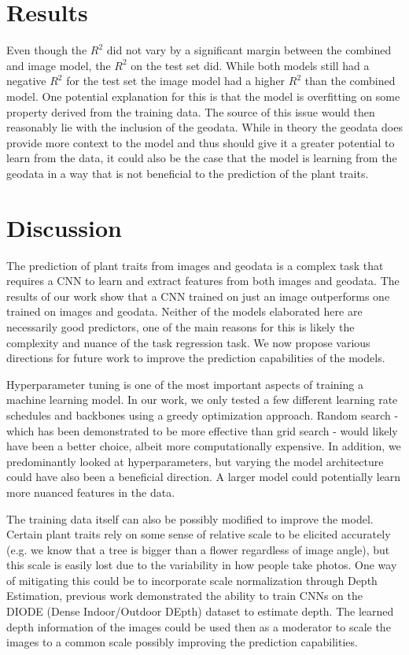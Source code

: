 \documentclass[12pt,a4paper,oneside]{article}
\begin{document}
\section{Results}

Even though the $R^2$ did not vary by a significant margin between the combined and image model, the $R^2$ on the test set did. While both models still had a negative $R^2$ for the test set the image model had a higher $R^2$ than the combined model. One potential explanation for this is that the model is overfitting on some property derived from the training data. The source of this issue would then reasonably lie with the inclusion of the geodata. While in theory the geodata does provide more context to the model and thus should give it a greater potential to learn from the data, it could also be the case that the model is learning from the geodata in a way that is not beneficial to the prediction of the plant traits.   


\section{Discussion}

The prediction of plant traits from images and geodata is a complex task that requires a CNN to learn and extract features from both images and geodata. The results of our work show that a CNN trained on just an image outperforms one trained on images and geodata. Neither of the models elaborated here are necessarily good predictors, one of the main reasons for this is likely the complexity and nuance of the task regression task. We now propose various directions for future work to improve the prediction capabilities of the models.

Hyperparameter tuning is one of the most important aspects of training a machine learning model. In our work, we only tested a few different learning rate schedules and backbones using a greedy optimization approach. Random search - which has been demonstrated to be more effective than grid search \cite{JMLR:v13:bergstra12a} - would likely have been a better choice, albeit more computationally expensive. In addition, we predominantly looked at hyperparameters, but varying the model architecture could have also been a beneficial direction. A larger model could potentially learn more nuanced features in the data. 

The training data itself can also be possibly modified to improve the model. Certain plant traits rely on some sense of relative scale to be elicited accurately (e.g. we know that a tree is bigger than a flower regardless of image angle), but this scale is easily lost due to the variability in how people take photos. One way of mitigating this could be to incorporate scale normalization through Depth Estimation, previous work \cite{Ummenhofer_2017} demonstrated the ability to train CNNs on the DIODE (Dense Indoor/Outdoor DEpth) \cite{vasiljevic2019diode} dataset to estimate depth. The learned depth information of the images could be used then as a moderator to scale the images to a common scale possibly improving the prediction capabilities.
\end{document}
